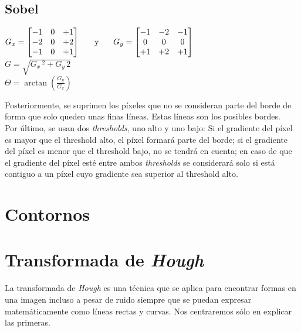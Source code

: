 \subsection{Sobel}
\begin{center}
  $ G_x = \begin{bmatrix}
    -1 & 0 & +1 \\
    -2 & 0 & +2 \\
    -1 & 0 & +1 \\
  \end{bmatrix}
  \hspace{0.5cm} \text{ y } \hspace{0.5cm} G_y = \begin{bmatrix}
    -1 & -2 & -1 \\
    0 & 0 & 0 \\
    +1 & +2 & +1 \\
  \end{bmatrix}
  $
  \\[0.5cm]
  $G = \sqrt{G_x\,^2 + G_y\,{2}}$
  \\[0.5cm]
  $\Theta= \arctan\left(\frac{G_y}{G_x} \right)$
\end{center}
Posteriormente, se suprimen los píxeles que no se consideran parte del
borde de forma que solo queden unas finas líneas. Estas líneas son los posibles bordes.\\
Por último, se usan dos \emph{thresholds}, uno alto y uno bajo: Si el
gradiente del píxel es mayor que el threshold alto, el píxel formará
parte del borde; si el gradiente del píxel es menor que el threshold
bajo, no se tendrá en cuenta; en caso de que el gradiente del píxel
esté entre ambos \emph{thresholds} se considerará solo si está
contiguo a un píxel cuyo gradiente sea superior al threshold alto.

\section{Contornos}

\section{Transformada de \emph{Hough}}
La transformada de \emph{Hough} es una técnica que se aplica para
encontrar formas en una imagen incluso a pesar de ruido siempre que se
puedan expresar matemáticamente como líneas rectas y curvas. Nos
centraremos sólo en explicar las primeras.
